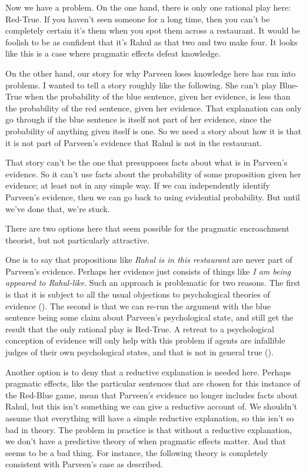 \documentclass[
  11pt,
  letterpaper,
  DIV=11,
  numbers=noendperiod,
  twoside]{scrartcl}
\begin{document}
Now we have a problem. On the one hand, there is only one rational play
here: Red-True. If you haven't seen someone for a long time, then you
can't be completely certain it's them when you spot them across a
restaurant. It would be foolish to be as confident that it's Rahul as
that two and two make four. It looks like this is a case where pragmatic
effects defeat knowledge.

On the other hand, our story for why Parveen loses knowledge here has
run into problems. I wanted to tell a story roughly like the following.
She can't play Blue-True when the probability of the blue sentence,
given her evidence, is less than the probability of the red sentence,
given her evidence. That explanation can only go through if the blue
sentence is itself not part of her evidence, since the probability of
anything given itself is one. So we need a story about how it is that it
is not part of Parveen's evidence that Rahul is not in the restaurant.

That story can't be the one that presupposes facts about what is in
Parveen's evidence. So it can't use facts about the probability of some
proposition given her evidence; at least not in any simple way. If we
can independently identify Parveen's evidence, then we can go back to
using evidential probability. But until we've done that, we're stuck.

There are two options here that seem possible for the pragmatic
encroachment theorist, but not particularly attractive.

One is to say that propositions like \emph{Rahul is in this restaurant}
are never part of Parveen's evidence. Perhaps her evidence just consists
of things like \emph{I am being appeared to Rahul-like}. Such an
approach is problematic for two reasons. The first is that it is subject
to all the usual objections to psychological theories of evidence
(). The second
is that we can re-run the argument with the blue sentence being some
claim about Parveen's psychological state, and still get the result that
the only rational play is Red-True. A retreat to a psychological
conception of evidence will only help with this problem if agents are
infallible judges of their own psychological states, and that is not in
general true ().

Another option is to deny that a reductive explanation is needed here.
Perhaps pragmatic effects, like the particular sentences that are chosen
for this instance of the Red-Blue game, mean that Parveen's evidence no
longer includes facts about Rahul, but this isn't something we can give
a reductive account of. We shouldn't assume that everything will have a
simple reductive explanation, so this isn't so bad in theory. The
problem in practice is that without a reductive explanation, we don't
have a predictive theory of when pragmatic effects matter. And that
seems to be a bad thing. For instance, the following theory is
completely consistent with Parveen's case as described.
\end{document}
